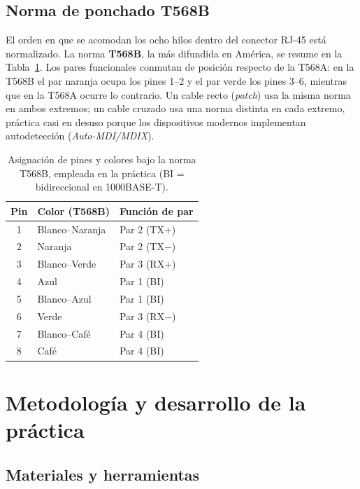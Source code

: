 \documentclass[11pt,a4paper]{article}
\begin{document}
\subsection{Norma de ponchado T568B}

El orden en que se acomodan los ocho hilos dentro del conector RJ-45 está
normalizado. La norma \textbf{T568B}, la más difundida en América, se resume
en la Tabla~\ref{tab:t568b}. Los pares funcionales conmutan de posición
respecto de la T568A: en la T568B el par naranja ocupa los pines 1--2 y el par
verde los pines 3--6, mientras que en la T568A ocurre lo contrario. Un cable
recto (\textit{patch}) usa la misma norma en ambos extremos; un cable cruzado
usa una norma distinta en cada extremo, práctica casi en desuso porque los
dispositivos modernos implementan autodetección (\textit{Auto-MDI/MDIX}).

\begin{table}[htbp]
  \centering
  \small
  \begin{tabular}{c l l}
    \toprule
    \textbf{Pin} & \textbf{Color (T568B)} & \textbf{Función de par} \\
    \midrule
    1 & Blanco--Naranja & Par 2 (TX+) \\
    2 & Naranja        & Par 2 (TX$-$) \\
    3 & Blanco--Verde  & Par 3 (RX+) \\
    4 & Azul           & Par 1 (BI)  \\
    5 & Blanco--Azul   & Par 1 (BI)  \\
    6 & Verde          & Par 3 (RX$-$) \\
    7 & Blanco--Café   & Par 4 (BI)  \\
    8 & Café           & Par 4 (BI)  \\
    \bottomrule
  \end{tabular}
  \caption{Asignación de pines y colores bajo la norma T568B, empleada en la
  práctica (BI = bidireccional en 1000BASE-T).}
  \label{tab:t568b}
\end{table}

\section{Metodología y desarrollo de la práctica}

\subsection{Materiales y herramientas}
\end{document}
